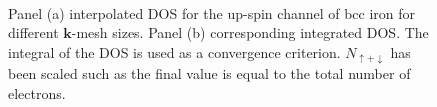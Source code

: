 \begin{itemize}
	\begin{figure}[h!]
	\centering
	 \\
	\centering
	\caption{Panel (a) interpolated DOS for the up-spin channel of bcc iron for different $\mathbf{k}$-mesh sizes. Panel (b) corresponding integrated DOS. The integral of the DOS is used as a convergence criterion. $N_{\uparrow+\downarrow}$ has been scaled such as the final value is equal to the total number of electrons.}\label{fig8.2}
	\end{figure}
\end{itemize}
\clearpage
